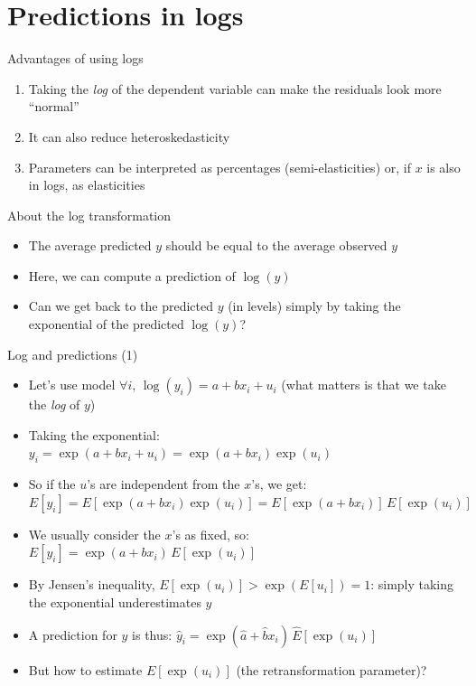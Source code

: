 \documentclass[aspectratio=169]{beamer}
\begin{document}
\section{Predictions in logs}

\begin{frame}{Advantages of using logs}
\begin{enumerate}
    \item Taking the \textit{log} of the dependent variable can make the residuals look more ``normal''
    \item It can also reduce heteroskedasticity
    \item Parameters can be interpreted as percentages (semi-elasticities) or, if $x$ is also in logs, as elasticities
\end{enumerate}
\end{frame}

\begin{frame}{About the log transformation}
\begin{itemize}
    \item The average predicted $y$ should be equal to the average observed $y$
    \item Here, we can compute a prediction of $\log(y)$
    \item Can we get back to the predicted $y$ (in levels) simply by taking the exponential of the predicted $\log(y)$?
\end{itemize}
\end{frame}

\begin{frame}{Log and predictions (1)}
\begin{itemize}
    \item Let's use model $\forall i$, $\log(y_i) = a + bx_i + u_i$ (what matters is that we take the \textit{log} of $y$)
    \item Taking the exponential:\\
    $y_i = \exp(a + bx_i + u_i) = \exp(a + bx_i)\exp(u_i)$
    \item So if the $u$'s are independent from the $x$'s, we get:\\
    $E[y_i] = E[\exp(a + bx_i)\exp(u_i)] = E[\exp(a + bx_i)]\,E[\exp(u_i)]$
    \item We usually consider the $x$'s as fixed, so:\\
    $E[y_i] = \exp(a + bx_i)\,E[\exp(u_i)]$
    \item By Jensen's inequality, $E[\exp(u_i)] > \exp(E[u_i]) = 1$: simply taking the exponential underestimates $y$
    \item A prediction for $y$ is thus: $\hat{y}_i = \exp(\hat{a} + \hat{b}x_i)\,\hat{E}[\exp(u_i)]$
    \item But how to estimate $E[\exp(u_i)]$ (the retransformation parameter)?
\end{itemize}
\end{frame}
\end{document}
